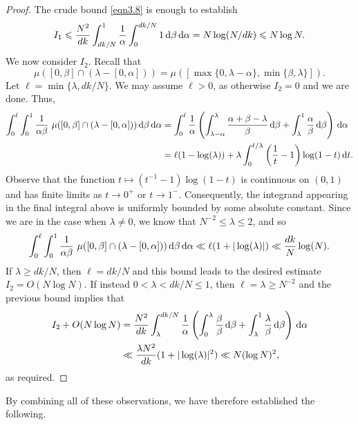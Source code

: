\documentclass[12pt,reqno]{amsart}
\theoremstyle{definition}
\theoremstyle{remark}
\numberwithin{equation}{section}
\def\d{{\,{\rm d}}}
\newcommand\1{\mathds{1}}
\begin{document}
\begin{proof}
The crude bound \eqref{eqn3.8} is enough to establish
\begin{equation*}
    I_1\leqslant \frac{N^2}{dk}\int_{dk/N}^1 \frac{1}{\alpha}\int_0^{dk/N} 1 \d\beta\d\alpha =N\log(N/dk) \leqslant N\log N.
\end{equation*}
We now consider $I_2$. Recall that
\begin{equation*}
    \mu( [0, \beta] \cap (\lambda - [0, \alpha] ) ) = \mu([\max\{0,\lambda -\alpha\}, \min\{\beta,\lambda\}]).
\end{equation*}
Let $\ell = \min\{ \lambda,dk/N\}$. We may assume $\ell>0$, as otherwise $I_2=0$ and we are done. Thus, 
\begin{align*}
    \int_0^\ell \int_{0}^1 \frac{1}{\alpha \beta} \ \mu( [0, \beta] \cap (\lambda - [0, \alpha] ) )\d\beta \d \alpha  &= \int_0^\ell \frac{1}{\alpha}\left(\int_{\lambda -\alpha }^\lambda \frac{\alpha +\beta-\lambda}{\beta}\d\beta +\int_\lambda^1\frac{\alpha}{\beta}\d\beta \right)\d\alpha\\
    &= \ell(1-\log(\lambda)) + \lambda\int_0^{\ell/\lambda}\left(\frac{1}{t} - 1\right)\log(1-t)\d t.
\end{align*}
Observe that the function $t\mapsto (t^{-1}-1)\log(1-t)$ is continuous on $(0,1)$ and has finite limits as $t\to 0^+$ or $t\to 1^-$. Consequently, the integrand appearing in the final integral above is uniformly bounded by some absolute constant. Since we are in the case when $\lambda\neq 0$, we know that $N^{-2}\leqslant \lambda \leqslant 2$, and so
\begin{equation*}
    \int_0^\ell \int_{0}^1 \frac{1}{\alpha \beta} \ \mu( [0, \beta] \cap (\lambda - [0, \alpha] ) )\d\beta \d \alpha \ll \ell(1+|\log(\lambda)|)\ll \frac{dk}{N}\log(N).
\end{equation*}
If $\lambda\geqslant dk/N$, then $\ell=dk/N$ and this bound leads to the desired estimate $I_2=O(N\log N)$. If instead $0<\lambda<dk/N\leqslant 1$, then $\ell=\lambda\geqslant N^{-2}$ and the previous bound implies that
\begin{align*}
    I_2 + O(N\log N) &= \frac{N^2}{dk}\int_\lambda^{dk/N}\frac{1}{\alpha}\left(\int_0^{\lambda}\frac{\beta}{\beta}\d\beta+\int_\lambda^1\frac{\lambda}{\beta}\d\beta\right)\d\alpha\\
    &\ll \frac{\lambda N^2}{dk}(1+|\log(\lambda)|^2) \ll N(\log N)^2,
\end{align*}
as required. 
\end{proof}

By combining all of these observations, we have therefore established the following.
\end{document}
